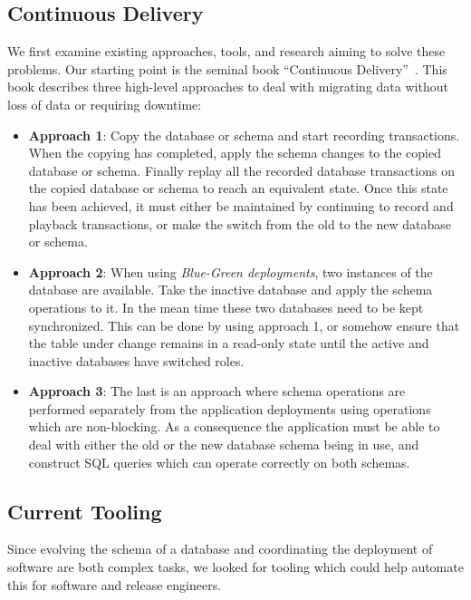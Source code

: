 \documentclass[conference]{IEEEtran}
\begin{document}

\subsection{Continuous Delivery}\label{sec:cd}

We first examine existing approaches, tools, and research aiming to solve these problems. Our starting point is the seminal book ``Continuous Delivery''~\cite{Humble:2010:CDR:1869904}. This book describes three high-level approaches to deal with migrating data without loss of data or requiring downtime:

\begin{itemize}
  \item{\textbf{Approach 1}: Copy the database or schema and start recording transactions. When the copying has completed, apply the schema changes to the copied database or schema. Finally replay all the recorded database transactions on the copied database or schema to reach an equivalent state. Once this state has been achieved, it must either be maintained by continuing to record and playback transactions, or make the switch from the old to the new database or schema.}
  \item{\textbf{Approach 2}: When using \textit{Blue-Green deployments}, two instances of the database are available. Take the inactive database and apply the schema operations to it. In the mean time these two databases need to be kept synchronized. This can be done by using approach 1, or somehow ensure that the table under change remains in a read-only state until the active and inactive databases have switched roles.}
  \item{\textbf{Approach 3}: The last is an approach where schema operations are performed separately from the application deployments using operations which are non-blocking. As a consequence the application must be able to deal with either the old or the new database schema being in use, and construct SQL queries which can operate correctly on both schemas.}
\end{itemize}

\subsection{Current Tooling} 
Since evolving the schema of a database and coordinating the deployment of software are both complex tasks, we looked for tooling which could help automate this for software and release engineers.
\end{document}
